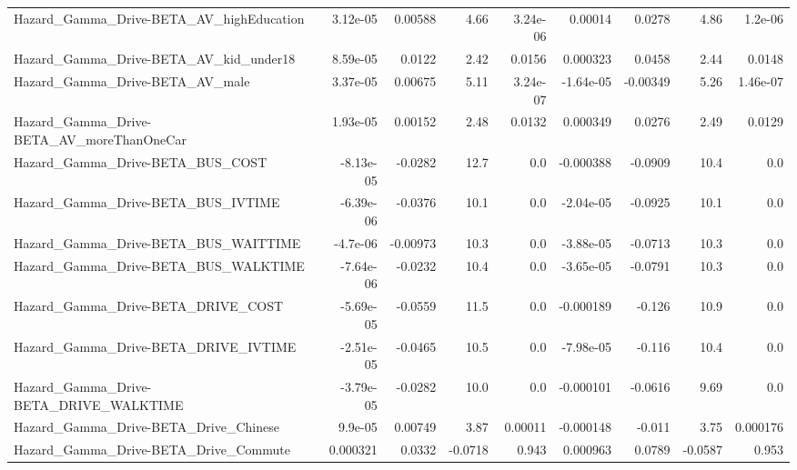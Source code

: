 \begin{tabular}{lrrrrrrrr}
Hazard\_Gamma\_Drive-BETA\_AV\_highEducation           &    3.12e-05 &      0.00588 &     4.66 & 3.24e-06 &    0.00014 &      0.0278 &         4.86 &       1.2e-06 \\
Hazard\_Gamma\_Drive-BETA\_AV\_kid\_under18             &    8.59e-05 &       0.0122 &     2.42 &   0.0156 &   0.000323 &      0.0458 &         2.44 &        0.0148 \\
Hazard\_Gamma\_Drive-BETA\_AV\_male                    &    3.37e-05 &      0.00675 &     5.11 & 3.24e-07 &  -1.64e-05 &    -0.00349 &         5.26 &      1.46e-07 \\
Hazard\_Gamma\_Drive-BETA\_AV\_moreThanOneCar          &    1.93e-05 &      0.00152 &     2.48 &   0.0132 &   0.000349 &      0.0276 &         2.49 &        0.0129 \\
Hazard\_Gamma\_Drive-BETA\_BUS\_COST                   &   -8.13e-05 &      -0.0282 &     12.7 &      0.0 &  -0.000388 &     -0.0909 &         10.4 &           0.0 \\
Hazard\_Gamma\_Drive-BETA\_BUS\_IVTIME                 &   -6.39e-06 &      -0.0376 &     10.1 &      0.0 &  -2.04e-05 &     -0.0925 &         10.1 &           0.0 \\
Hazard\_Gamma\_Drive-BETA\_BUS\_WAITTIME               &    -4.7e-06 &     -0.00973 &     10.3 &      0.0 &  -3.88e-05 &     -0.0713 &         10.3 &           0.0 \\
Hazard\_Gamma\_Drive-BETA\_BUS\_WALKTIME               &   -7.64e-06 &      -0.0232 &     10.4 &      0.0 &  -3.65e-05 &     -0.0791 &         10.3 &           0.0 \\
Hazard\_Gamma\_Drive-BETA\_DRIVE\_COST                 &   -5.69e-05 &      -0.0559 &     11.5 &      0.0 &  -0.000189 &      -0.126 &         10.9 &           0.0 \\
Hazard\_Gamma\_Drive-BETA\_DRIVE\_IVTIME               &   -2.51e-05 &      -0.0465 &     10.5 &      0.0 &  -7.98e-05 &      -0.116 &         10.4 &           0.0 \\
Hazard\_Gamma\_Drive-BETA\_DRIVE\_WALKTIME             &   -3.79e-05 &      -0.0282 &     10.0 &      0.0 &  -0.000101 &     -0.0616 &         9.69 &           0.0 \\
Hazard\_Gamma\_Drive-BETA\_Drive\_Chinese              &     9.9e-05 &      0.00749 &     3.87 &  0.00011 &  -0.000148 &      -0.011 &         3.75 &      0.000176 \\
Hazard\_Gamma\_Drive-BETA\_Drive\_Commute              &    0.000321 &       0.0332 &  -0.0718 &    0.943 &   0.000963 &      0.0789 &      -0.0587 &         0.953 \\

\end{tabular}
